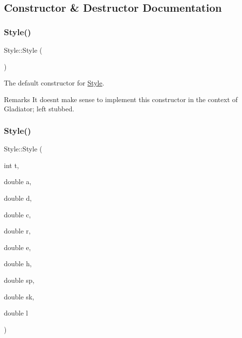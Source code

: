 \subsection{Constructor \& Destructor Documentation}
\mbox{\label{class_style_a914f187818eb30c0cebe3df5378bfa0a}} 
\subsubsection{\texorpdfstring{Style()}{Style()}\hspace{0.1cm}{\footnotesize\ttfamily [1/2]}}
{\footnotesize\ttfamily Style\+::\+Style (\begin{DoxyParamCaption}{ }\end{DoxyParamCaption})}



The default constructor for \mbox{\hyperlink{class_style}{Style}}. 

\begin{DoxyRemark}{Remarks}
It doesn\textquotesingle{}t make sense to implement this constructor in the context of Gladiator; left stubbed. 
\end{DoxyRemark}
\mbox{\label{class_style_a5f36adc7f50bf705b9c21817cb05c267}} 
\subsubsection{\texorpdfstring{Style()}{Style()}\hspace{0.1cm}{\footnotesize\ttfamily [2/2]}}
{\footnotesize\ttfamily Style\+::\+Style (\begin{DoxyParamCaption}\item[{int}]{t,  }\item[{double}]{a,  }\item[{double}]{d,  }\item[{double}]{c,  }\item[{double}]{r,  }\item[{double}]{e,  }\item[{double}]{h,  }\item[{double}]{sp,  }\item[{double}]{sk,  }\item[{double}]{l }\end{DoxyParamCaption})}



